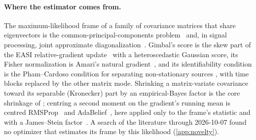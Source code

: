 \paragraph{Where the estimator comes from.} The maximum-likelihood frame of a family of covariance
matrices that share eigenvectors is the common-principal-components problem~\citep{flury1984cpc}
and, in signal processing, joint approximate diagonalization~\citep{pham2001joint}. Gimbal's score is
the skew part of the EASI relative-gradient update~\citep{cardoso1996easi} with a heteroscedastic
Gaussian score, its Fisher normalization is Amari's natural gradient~\citep{amari1998natural}, and
its identifiability condition is the Pham--Cardoso condition for separating non-stationary sources
\citep{pham2001blind}, with time blocks replaced by the other matrix mode. Shrinking a
matrix-variate covariance toward its separable (Kronecker) part by an empirical-Bayes factor is the
core shrinkage of \citet{hoff2023core}; centring a second moment on the gradient's running mean is
centred RMSProp~\citep{graves2013generating} and AdaBelief~\citep{zhuang2020adabelief}, here applied
only to the frame's statistic and with a James--Stein factor~\citep{james1961estimation}. A search of
the literature through 2026-10-07 found no optimizer that estimates its frame by this likelihood
(\cref{app:novelty}).
